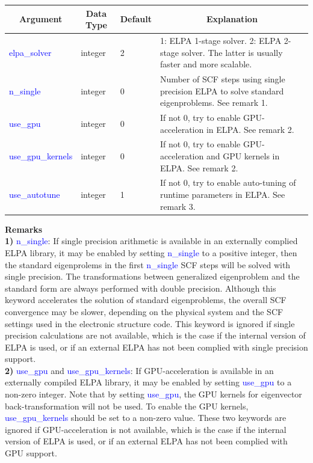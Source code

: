 \documentclass{report}
\begin{document}
\begin{tabular}[]{|p{30mm}|p{20mm}|p{15mm}|p{100mm}|}
\hline
\multicolumn{1}{|c|}{\textbf{Argument}} & \multicolumn{1}{c|}{\textbf{Data Type}} & \multicolumn{1}{c|}{\textbf{Default}} & \multicolumn{1}{c|}{\textbf{Explanation}}\\
\hline
\textcolor{blue}{elpa\_solver}      & integer & 2 & 1:  ELPA 1-stage solver.  2:  ELPA 2-stage solver.  The latter is usually faster and more scalable.\\
\hline
\textcolor{blue}{n\_single}         & integer & 0 & Number of SCF steps using single precision ELPA to solve standard eigenproblems.  See remark 1.\\
\hline
\textcolor{blue}{use\_gpu}          & integer & 0 & If not 0, try to enable GPU-acceleration in ELPA.  See remark 2.\\
\hline
\textcolor{blue}{use\_gpu\_kernels} & integer & 0 & If not 0, try to enable GPU-acceleration and GPU kernels in ELPA.  See remark 2.\\
\textcolor{blue}{use\_autotune}     & integer & 1 & If not 0, try to enable auto-tuning of runtime parameters in ELPA.  See remark 3.\\
\hline
\end{tabular}

\bigskip
\textbf{Remarks}\\

\textbf{1)} \textcolor{blue}{n\_single}:  If single precision arithmetic is available in an externally complied ELPA library, it may be enabled by setting \textcolor{blue}{n\_single} to a positive integer, then the standard eigenprolems in the first \textcolor{blue}{n\_single} SCF steps will be solved with single precision.  The transformations between generalized eigenproblem and the standard form are always performed with double precision.  Although this keyword accelerates the solution of standard eigenproblems, the overall SCF convergence may be slower, depending on the physical system and the SCF settings used in the electronic structure code.  This keyword is ignored if single precision calculations are not available, which is the case if the internal version of ELPA is used, or if an external ELPA has not been complied with single precision support.\\

\textbf{2)} \textcolor{blue}{use\_gpu} and \textcolor{blue}{use\_gpu\_kernels}:  If GPU-acceleration is available in an externally compiled ELPA library, it may be enabled by setting \textcolor{blue}{use\_gpu} to a non-zero integer.  Note that by setting \textcolor{blue}{use\_gpu}, the GPU kernels for eigenvector back-transformation will not be used.  To enable the GPU kernels, \textcolor{blue}{use\_gpu\_kernels} should be set to a non-zero value.  These two keywords are ignored if GPU-acceleration is not available, which is the case if the internal version of ELPA is used, or if an external ELPA has not been complied with GPU support.\\
\end{document}

